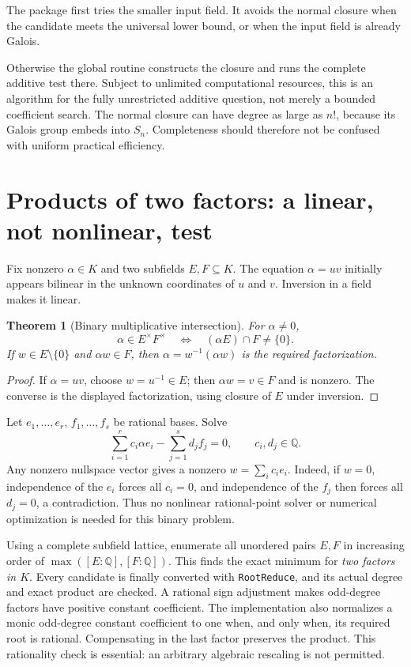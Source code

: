 \documentclass[11pt,letterpaper]{article}
\newtheorem{theorem}{Theorem}[section]
\theoremstyle{definition}
\theoremstyle{remark}
\newcommand{\Q}{\mathbb Q}
\newcommand{\wl}[1]{\texttt{#1}}
\begin{document}
The package first tries the smaller input field. It avoids the normal
closure when the candidate meets the universal lower bound, or when the
input field is already Galois.

Otherwise the global routine constructs the closure and runs the complete
additive test there. Subject to unlimited computational resources, this is
an algorithm for the fully unrestricted additive question, not merely a
bounded coefficient search. The normal closure can have degree as large as
\(n!\), because its Galois group embeds into \(S_n\). Completeness should
therefore not be confused with uniform practical efficiency.

\section{Products of two factors: a linear, not nonlinear, test}
\label{sec:binary}
Fix nonzero \(\alpha\in K\) and two subfields \(E,F\subseteq K\).
The equation \(\alpha=uv\) initially appears bilinear in the unknown
coordinates of \(u\) and \(v\). Inversion in a field makes it linear.

\begin{theorem}[Binary multiplicative intersection]\label{thm:binary}
For \(\alpha\ne0\),
\[
 \alpha\in E^\times F^\times
 \quad\Longleftrightarrow\quad
 (\alpha E)\cap F\ne\{0\}.
\]
If \(w\in E\setminus\{0\}\) and \(\alpha w\in F\), then
\(\alpha=w^{-1}(\alpha w)\) is the required factorization.
\end{theorem}
\begin{proof}
If \(\alpha=uv\), choose \(w=u^{-1}\in E\); then \(\alpha w=v\in F\)
and is nonzero. The converse is the displayed factorization, using closure
of \(E\) under inversion.
\end{proof}
Let \(e_1,\ldots,e_r\), \(f_1,\ldots,f_s\) be rational bases. Solve
\begin{equation}
 \sum_{i=1}^r c_i\alpha e_i-\sum_{j=1}^s d_jf_j=0,
 \qquad c_i,d_j\in\Q.\label{eq:binarymatrix}
\end{equation}
Any nonzero nullspace vector gives a nonzero
\(w=\sum_i c_ie_i\). Indeed, if \(w=0\), independence of the \(e_i\)
forces all \(c_i=0\), and independence of the \(f_j\) then forces all
\(d_j=0\), a contradiction. Thus no nonlinear rational-point solver or
numerical optimization is needed for this binary problem.

Using a complete subfield lattice, enumerate all unordered pairs \(E,F\)
in increasing order of \(\max([E:\Q],[F:\Q])\). This finds the exact
minimum for \emph{two factors in \(K\)}. Every candidate is finally
converted with \wl{RootReduce}, and its actual degree and exact product are
checked. A rational sign adjustment makes odd-degree factors have positive constant
coefficient. The implementation also normalizes a monic odd-degree constant
coefficient to one when, and only when, its required root is rational.
Compensating in the last factor preserves the product. This rationality
check is essential: an arbitrary algebraic rescaling is not permitted.
\end{document}
